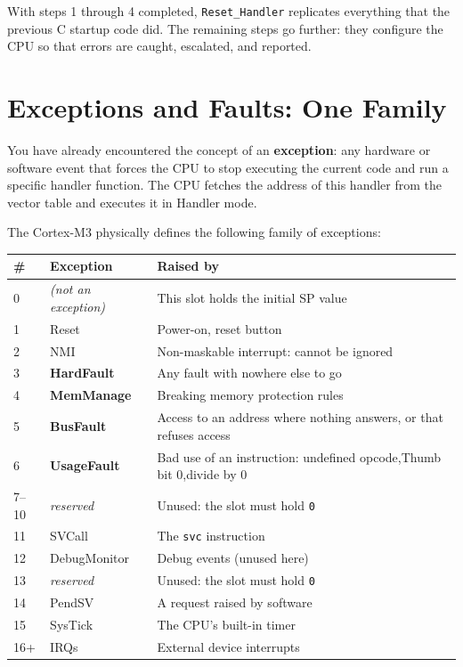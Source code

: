 With steps 1 through 4 completed, \texttt{Reset\_Handler} replicates everything that the previous C startup code did. The remaining steps go further: they configure the CPU so that errors are caught, escalated, and reported.

\section{Exceptions and Faults: One Family}
You have already encountered the concept of an \textbf{exception}: any hardware or software event that forces the CPU to stop executing the current code and run a specific handler function. The CPU fetches the address of this handler from the vector table and executes it in Handler mode. 

The Cortex-M3 physically defines the following family of exceptions:

\begin{table}[h!]
    \centering
    \begin{tabular}{|l|l|l|}
        \hline
        \textbf{\#} & \textbf{Exception} & \textbf{Raised by} \\ \hline
        0 & \textit{(not an exception)} & This slot holds the initial SP value \\ \hline
        1 & Reset & Power-on, reset button \\ \hline
        2 & NMI & Non-maskable interrupt: cannot be ignored \\ \hline
        3 & \textbf{HardFault} & Any fault with nowhere else to go \\ \hline
        4 & \textbf{MemManage} & Breaking memory protection rules \\ \hline
        5 & \textbf{BusFault} & Access to an address where nothing answers, or that refuses access \\ \hline
        6 & \textbf{UsageFault} & Bad use of an instruction: undefined opcode,Thumb bit 0,divide by 0 \\ \hline
        7--10 & \textit{reserved} & Unused: the slot must hold \texttt{0} \\ \hline
        11 & SVCall & The \texttt{svc} instruction \\ \hline
        12 & DebugMonitor & Debug events (unused here) \\ \hline
        13 & \textit{reserved} & Unused: the slot must hold \texttt{0} \\ \hline
        14 & PendSV & A request raised by software \\ \hline
        15 & SysTick & The CPU's built-in timer \\ \hline
        16+ & IRQs & External device interrupts \\ \hline
    \end{tabular}
\end{table}

